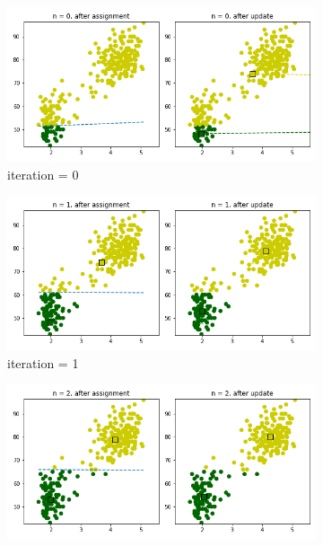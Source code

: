 \documentclass{homework}
\begin{document}
\begin{enumerate}[label=(\alph*)]
		\begin{figure}
		     \centering
		     \begin{subfigure}[b]{0.4\textwidth}
		         \centering
		         \includegraphics[width=\textwidth]{kmeans_visualization_0.png}
		         \caption{iteration = 0}
		     \end{subfigure}
		     \hfill
		     \begin{subfigure}[b]{0.4\textwidth}
		         \centering
		         \includegraphics[width=\textwidth]{kmeans_visualization_1.png}
		         \caption{iteration = 1}
		     \end{subfigure}
		     \hfill
		     \begin{subfigure}[b]{0.4\textwidth}
		         \centering
		         \includegraphics[width=\textwidth]{kmeans_visualization_2.png}

\end{subfigure}
\end{figure}
\end{enumerate}
\end{document}
